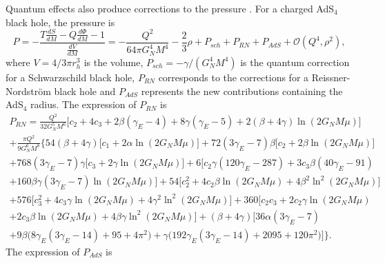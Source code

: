 \documentclass[10pt,a4paper]{article}
\begin{document}
Quantum effects also produce corrections to the pressure \cite{Calmet:2021lny, Delgado:2022pcc}. For a charged AdS$_4$ black hole, the pressure is
\begin{equation}
    P=-\frac{T\frac{dS}{dM}-Q\frac{d\Phi}{dM}-1}{\frac{dV}{dM}}=-\frac{Q^2}{64\pi G^4_N M^4}-\frac{2}{3}\rho+P_{sch}+P_{RN}+P_{AdS}+\mathcal{O}\left(Q^4,\rho^2\right),
\end{equation}
where $V=4/3\pi r^3_h$ is the volume, $P_{sch}=-\gamma/(G^4_NM^4)$ is the quantum correction for a Schwarzschild black hole, $P_{RN}$ corresponds to the corrections for a Reissner-Nordstr\"om black hole and $P_{AdS}$ represents the new contributions containing the AdS$_4$ radius.
The expression of $P_{RN}$ is \cite{Delgado:2022pcc}
\begin{multline}
    P_{RN}=\frac{Q^2}{32G^5_NM^6}\Big[c_2+4c_3+2\beta(\gamma_E-4)+8\gamma(\gamma_E-5)+2(\beta+4\gamma)\ln(2G_NM\mu)\Big]
    \\+\frac{\pi Q^2}{9G^6_NM^8}\bigg\{54(\beta+4\gamma)\Big[c_1+2\alpha\ln\left(2G_NM\mu\right)\Big]
    +72(3\gamma_E-7)\beta\Big[c_2+2\beta\ln\left(2G_NM\mu\right)\Big]\\
    +768(3\gamma_E-7)\gamma\Big[c_3+2\gamma\ln\left(2G_NM\mu\right)\Big]
    +6\Big[c_2\gamma(120\gamma_E-287)+3c_3\beta(40\gamma_E-91)\\
    +160\beta\gamma(3\gamma_E-7)\ln\left(2G_NM\mu\right)\Big]
     +54\Big[c^2_2+4c_2\beta\ln\left(2G_NM\mu\right)+4\beta^2\ln^2\left(2G_NM\mu\right)\Big]\\
   +576\Big[c^2_3+4c_3\gamma\ln\left(2G_NM\mu\right)+4\gamma^2\ln^2\left(2G_NM\mu\right)\Big]
   +360\Big[c_2c_3+2c_2\gamma\ln\left(2G_NM\mu\right)\\+2c_3\beta\ln\left(2G_NM\mu\right)
    +4\beta\gamma\ln^2\left(2G_NM\mu\right)\Big]+(\beta+4\gamma)\Big[36\alpha(3\gamma_E-7) \\+9\beta\big(8\gamma_E(3\gamma_E-14)+95+4\pi^2\big)
    +\gamma\big(192\gamma_E(3\gamma_E-14)+2095+120\pi^2\big)\Big]
    \bigg\}.
    \end{multline}
The expression of $P_{AdS}$ is
\end{document}
